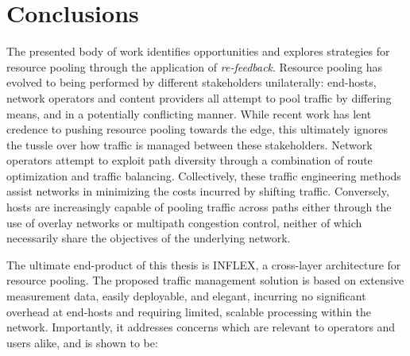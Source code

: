 \chapter{Conclusions}
\label{chapter:conclusions}

The presented body of work identifies opportunities and explores strategies for resource pooling through the application of \emph{re-feedback}.
Resource pooling has evolved to being performed by different stakeholders unilaterally: end-hosts, network operators and content providers all attempt to pool traffic by differing means, and in a potentially conflicting manner.
While recent work \cite{Kelly:2005p140,Wischik:2008p137,Wischik:2011p540} has lent credence to pushing resource pooling towards the edge, this ultimately ignores the tussle over how traffic is managed between these stakeholders.
Network operators attempt to exploit path diversity through a combination of route optimization and traffic balancing.
Collectively, these traffic engineering methods assist networks in minimizing the costs incurred by shifting traffic.
Conversely, hosts are increasingly capable of pooling traffic across paths either through the use of overlay networks or multipath congestion control, neither of which necessarily share the objectives of the underlying network.

The ultimate end-product of this thesis is INFLEX, a cross-layer architecture for resource pooling.
The proposed traffic management solution is based on extensive measurement data, easily deployable, and elegant, incurring no significant overhead at end-hosts and requiring limited, scalable processing within the network.
Importantly, it addresses concerns which are relevant to operators and users alike, and is shown to be:

